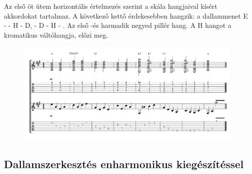 Az első öt ütem horizontális értelmezés szerint a skála hangjaival kísért akkordokat tartalmaz.
A következő kettő érdekesebben hangzik: a dallammenet  E - \aisz - H - D, \gisz - D - H - \gisz. Az első -és harmadik negyed pillér hang. A H hangot a kromatikus váltóhangja, \aisz előzi meg.

\begin{figure}[!htbp]
 \advance\leftskip-6mm
 \includegraphics[page=1,scale=0.70]{notes/dallamszerkesztes.pdf}
\end{figure}

\subsection{Dallamszerkesztés enharmonikus kiegészítéssel}
\label{sec:exdallamenharm}
